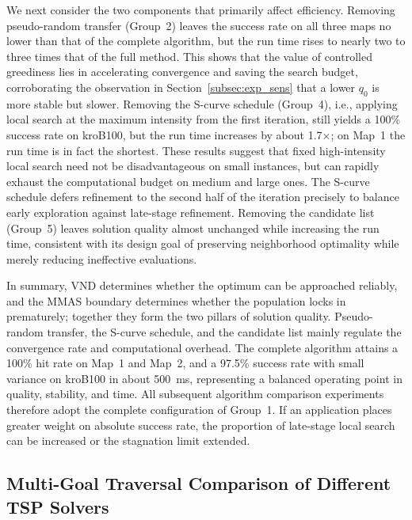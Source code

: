 \documentclass[pdflatex,sn-basic,Numbered]{sn-jnl}
\begin{document}
We next consider the two components that primarily affect efficiency. Removing pseudo-random transfer (Group~2) leaves the success rate on all three maps no lower than that of the complete algorithm, but the run time rises to nearly two to three times that of the full method. This shows that the value of controlled greediness lies in accelerating convergence and saving the search budget, corroborating the observation in Section~\ref{subsec:exp_sens} that a lower $q_0$ is more stable but slower. Removing the S-curve schedule (Group~4), i.e., applying local search at the maximum intensity from the first iteration, still yields a 100\% success rate on kroB100, but the run time increases by about 1.7$\times$; on Map~1 the run time is in fact the shortest. These results suggest that fixed high-intensity local search need not be disadvantageous on small instances, but can rapidly exhaust the computational budget on medium and large ones. The S-curve schedule defers refinement to the second half of the iteration precisely to balance early exploration against late-stage refinement. Removing the candidate list (Group~5) leaves solution quality almost unchanged while increasing the run time, consistent with its design goal of preserving neighborhood optimality while merely reducing ineffective evaluations.

In summary, VND determines whether the optimum can be approached reliably, and the MMAS boundary determines whether the population locks in prematurely; together they form the two pillars of solution quality. Pseudo-random transfer, the S-curve schedule, and the candidate list mainly regulate the convergence rate and computational overhead. The complete algorithm attains a 100\% hit rate on Map~1 and Map~2, and a 97.5\% success rate with small variance on kroB100 in about 500~ms, representing a balanced operating point in quality, stability, and time. All subsequent algorithm comparison experiments therefore adopt the complete configuration of Group~1. If an application places greater weight on absolute success rate, the proportion of late-stage local search can be increased or the stagnation limit extended.

\subsection{Multi-Goal Traversal Comparison of Different TSP Solvers}
\label{subsec:exp_cmp}
\end{document}
